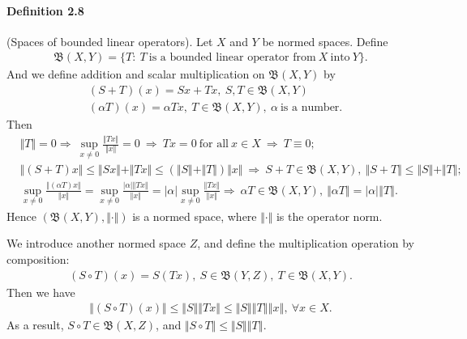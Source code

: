 \documentclass{article}
\begin{document}
\paragraph{Definition 2.8\label{def:2.8}} (Spaces of bounded linear operators). Let $X$ and $Y$ be normed spaces. Define 
\begin{align*}
	\mathfrak{B}(X,Y)=\{T:\ T\ \text{is a bounded linear operator from}\ X\ \text{into}\ Y\}.
\end{align*}
And we define addition and scalar multiplication on $\mathfrak{B}(X,Y)$ by
\begin{align*}
	&(S+T)(x) = Sx + Tx,\ S,T\in\mathfrak{B}(X,Y)\\
	&(\alpha T)(x) = \alpha Tx,\ T\in\mathfrak{B}(X,Y),\ \alpha\ \text{is a number}.
\end{align*}
Then
\begin{align*}
	&\Vert T\Vert = 0 \Rightarrow\ \sup_{x\neq 0}\frac{\Vert Tx\Vert}{\Vert x\Vert} = 0\ \Rightarrow\ Tx=0\ \text{for all}\ x\in X\ \Rightarrow\ T\equiv 0;\\
	&\Vert (S+T)x\Vert \leq\Vert Sx\Vert + \Vert Tx\Vert \leq (\Vert S\Vert + \Vert T\Vert)\Vert x\Vert\ \Rightarrow\ S+T\in\mathfrak{B}(X,Y),\ \Vert S+T\Vert\leq\Vert S\Vert + \Vert T\Vert;\\
	&\sup_{x\neq 0}\frac{\Vert (\alpha T)x\Vert}{\Vert x\Vert} = \sup_{x\neq 0}\frac{\vert\alpha\vert\Vert Tx\Vert}{\Vert x\Vert} = \vert\alpha\vert\sup_{x\neq 0}\frac{\Vert Tx\Vert}{\Vert x\Vert} \Rightarrow\ \alpha T\in\mathfrak{B}(X,Y),\ \Vert\alpha T \Vert=\vert\alpha\vert\left\Vert T\right\Vert.
\end{align*}
Hence $(\mathfrak{B}(X,Y),\Vert\cdot\Vert)$ is a normed space, where $\Vert\cdot\Vert$ is the operator norm. \vspace{0.1cm}

We introduce another normed space $Z$, and define the multiplication operation by composition:
\begin{align*}
	(S\circ T)(x) = S(Tx),\ S\in\mathfrak{B}(Y,Z),\ T\in\mathfrak{B}(X,Y).
\end{align*}
Then we have
\begin{align*}
	\Vert(S\circ T)(x)\Vert\leq\Vert S\Vert\left\Vert Tx\right\Vert\leq\Vert S\Vert\left\Vert T\right\Vert\left\Vert x\right\Vert,\ \forall x\in X.
\end{align*}
As a result, $S\circ T\in\mathfrak{B}(X,Z)$, and $\Vert S\circ T\Vert\leq\Vert S\Vert\left\Vert T\right\Vert$.
\vspace{0.1cm}
\end{document}
